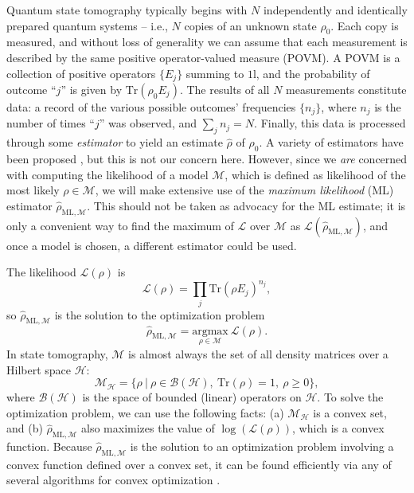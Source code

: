 \documentclass[aps,pra, twocolumn]{revtex4-1}
\newcommand{\M}{\mathcal{M}}
\newcommand{\Tr}{\mathrm{Tr}}
\newcommand{\cH}{\mathcal{H}}
\newcommand{\cL}{\mathcal{L}}
\newcommand{\Id}{\mathbb{I}}
\def\Id{1\!\mathrm{l}}
\newcommand{\rhohat}{\hat{\rho}}
\newcommand{\rhoML}[1]{\rhohat_{\scriptscriptstyle{\mathrm{ML},#1}}}
\begin{document}
Quantum state tomography typically begins with $N$ independently and identically prepared quantum systems -- i.e., $N$ copies of an unknown state $\rho_{0}$.  Each copy is measured, and without loss of generality we can assume that each measurement is described by the same positive operator-valued measure (POVM).  A POVM is a collection of positive operators $\{E_j\}$ summing to $\Id$, and the probability of outcome ``$j$'' is given by $\Tr(\rho_0 E_j)$.  The results of all $N$ measurements constitute data:  a record of the various possible outcomes' frequencies $\{n_{j}\}$, where $n_{j}$ is the number of times ``$j$'' was observed, and $\sum_{j}n_{j} = N$.  Finally, this data is processed through some \emph{estimator} to yield an estimate $\hat{\rho}$ of $\rho_0$.  A variety of estimators have been proposed \cite{VogelRisken97,Hradil,James01,BlumeKohoutNJP10,BlumeKohoutPRL10,BLUE,FerriePRL16}, but this is not our concern here.  However, since we \emph{are} concerned with computing the likelihood of a model $\M$, which is defined as likelihood of the most likely $\rho\in\M$, we will make extensive use of the \emph{maximum likelihood} (ML) estimator $\rhoML{\M}$.  This should not be taken as advocacy for the ML estimate; it is only a convenient way to find the maximum of $\cL$ over $\M$ as $\mathcal{L}(\rhoML{\M})$, and once a model is chosen, a different estimator could be used.

The likelihood $\mathcal{L}(\rho)$ is
\begin{equation}
\mathcal{L}(\rho) = \prod_{j}\mathrm{Tr}(\rho E_{j})^{n_{j}},
\end{equation}
so $\rhoML{\M}$ is the solution to the optimization problem
\begin{equation}
\rhoML{\M} = \underset{\rho \in \M}{\text{argmax}}~\mathcal{L}(\rho).
\end{equation}
In state tomography, $\M$ is almost always the set of all density matrices over a Hilbert space $\cH$:
\begin{equation}
\mathcal{M}_{\cH} = \{\rho~|~\rho \in \mathcal{B}(\mathcal{H}),~\mathrm{Tr}(\rho) =1,~\rho \geq 0\},
\end{equation}
where $\mathcal{B}(\cH)$ is the space of bounded (linear) operators on $\cH$.  To solve the optimization problem, we can use the following facts: (a) $\M_{\cH}$ is a convex set, and (b) $\rhoML{\M}$ also maximizes the value of $\log(\cL(\rho))$, which is a convex function. Because $\rhoML{\M}$ is the solution to an optimization problem involving a convex function defined over a convex set, it can be found efficiently via any of several algorithms for convex optimization \cite{Boyd}.
\end{document}

